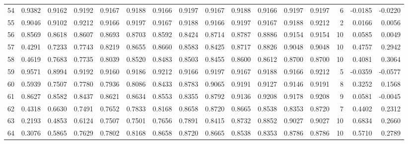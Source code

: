 \begin{tabular}{lrrrrrrrrrrrrrrr}
54  &      0.9382 &  0.9162 &  0.9192 &  0.9167 &  0.9188 &  0.9166 &  0.9197 &  0.9167 &  0.9188 &  0.9166 &   0.9197 &     0.9197 &      6 &                   -0.0185 &                    -0.0220 \\
55  &      0.9046 &  0.9102 &  0.9212 &  0.9166 &  0.9197 &  0.9167 &  0.9188 &  0.9166 &  0.9197 &  0.9167 &   0.9188 &     0.9212 &      2 &                    0.0166 &                     0.0056 \\
56  &      0.8569 &  0.8618 &  0.8607 &  0.8693 &  0.8703 &  0.8592 &  0.8424 &  0.8714 &  0.8787 &  0.8886 &   0.9154 &     0.9154 &     10 &                    0.0585 &                     0.0049 \\
57  &      0.4291 &  0.7233 &  0.7743 &  0.8219 &  0.8655 &  0.8660 &  0.8583 &  0.8425 &  0.8717 &  0.8826 &   0.9048 &     0.9048 &     10 &                    0.4757 &                     0.2942 \\
58  &      0.4619 &  0.7683 &  0.7735 &  0.8039 &  0.8520 &  0.8483 &  0.8503 &  0.8455 &  0.8600 &  0.8612 &   0.8700 &     0.8700 &     10 &                    0.4081 &                     0.3064 \\
59  &      0.9571 &  0.8994 &  0.9192 &  0.9160 &  0.9186 &  0.9212 &  0.9166 &  0.9197 &  0.9167 &  0.9188 &   0.9166 &     0.9212 &      5 &                   -0.0359 &                    -0.0577 \\
60  &      0.5939 &  0.7507 &  0.7780 &  0.7936 &  0.8086 &  0.8433 &  0.8783 &  0.9065 &  0.9191 &  0.9127 &   0.9146 &     0.9191 &      8 &                    0.3252 &                     0.1568 \\
61  &      0.8627 &  0.8582 &  0.8437 &  0.8621 &  0.8634 &  0.8553 &  0.8355 &  0.8792 &  0.9136 &  0.9208 &   0.9178 &     0.9208 &      9 &                    0.0581 &                    -0.0045 \\
62  &      0.4318 &  0.6630 &  0.7491 &  0.7652 &  0.7833 &  0.8168 &  0.8658 &  0.8720 &  0.8665 &  0.8538 &   0.8353 &     0.8720 &      7 &                    0.4402 &                     0.2312 \\
63  &      0.2193 &  0.4853 &  0.6124 &  0.7507 &  0.7501 &  0.7656 &  0.7891 &  0.8415 &  0.8732 &  0.8852 &   0.9027 &     0.9027 &     10 &                    0.6834 &                     0.2660 \\
64  &      0.3076 &  0.5865 &  0.7629 &  0.7802 &  0.8168 &  0.8658 &  0.8720 &  0.8665 &  0.8538 &  0.8353 &   0.8786 &     0.8786 &     10 &                    0.5710 &                     0.2789 \\

\end{tabular}
